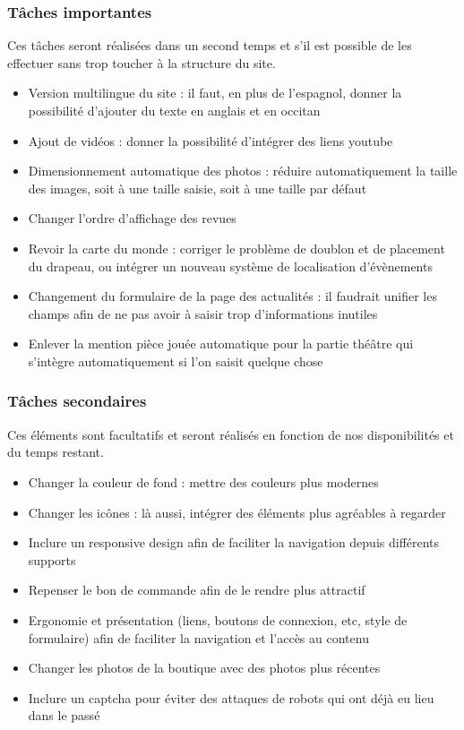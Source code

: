 \documentclass[11pt]{report}
\begin{document}
\subsubsection*{Tâches importantes}
Ces tâches seront réalisées dans un second temps et s'il est possible de les effectuer sans trop toucher à la structure du site.
\begin{itemize}
 \item Version multilingue du site : il faut, en plus de l'espagnol, donner la
possibilité d'ajouter du texte en anglais et en occitan 
 \item Ajout de vidéos : donner la possibilité d'intégrer des liens youtube
 \item Dimensionnement automatique des photos : réduire automatiquement la
taille des images, soit à une taille saisie, soit à une taille par défaut 
 \item Changer l'ordre d'affichage des revues
 \item Revoir la carte du monde : corriger le problème de doublon et de
placement du drapeau, ou intégrer un nouveau système de localisation d’évènements
 \item Changement du formulaire de la page des actualités : il faudrait unifier
 les champs afin de ne pas avoir à saisir trop d'informations inutiles
 \item Enlever la mention \og pièce jouée \fg automatique pour la partie théâtre
 qui s'intègre automatiquement si l'on saisit quelque chose
\end{itemize}


\subsubsection*{Tâches secondaires}
Ces éléments sont facultatifs et seront réalisés en fonction de nos disponibilités et du temps restant.
\begin{itemize}
\item Changer la couleur de fond : mettre des couleurs plus modernes
\item Changer les icônes : là aussi, intégrer des éléments plus agréables à
regarder
\item Inclure un responsive design afin de faciliter la navigation depuis
différents supports
\item Repenser le bon de commande afin de le rendre plus attractif
\item Ergonomie et présentation (liens, boutons de connexion, etc, style de
formulaire) afin de faciliter la navigation et l'accès au contenu
\item Changer les photos de la boutique avec des photos plus récentes
\item Inclure un captcha pour éviter des attaques de robots qui ont déjà eu lieu
dans le passé
\end{itemize}
\end{document}
